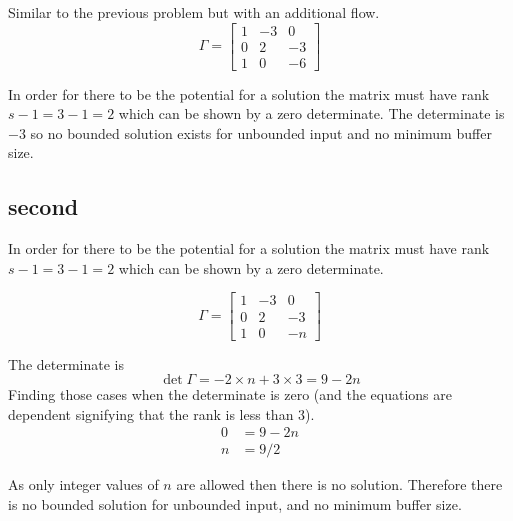 \documentclass{article}
\begin{document}
Similar to the previous problem but with an additional flow.
\begin{equation}
\Gamma =
\begin{bmatrix}
1 & -3 & 0 \\
0 & 2 & -3 \\
1 & 0 & -6
\end{bmatrix}
\end{equation}

In order for there to be the potential for a solution the
matrix must have rank $s - 1 = 3 - 1 = 2$ which can
be shown by a zero determinate. The determinate is $-3$
so no bounded solution exists for unbounded input and no minimum buffer size.



\subsection{second}



In order for there to be the potential for a solution the
matrix must have rank $s - 1 = 3 - 1 = 2$ which can
be shown by a zero determinate.

\begin{equation}
\Gamma =
\begin{bmatrix}
1 & -3 & 0 \\
0 & 2 & -3 \\
1 & 0 & -n
\end{bmatrix}
\end{equation}

The determinate is
\begin{equation}
\det{ \Gamma } = - 2 \times n + 3 \times 3 = 9 - 2 n
\end{equation}
Finding those cases when the determinate is zero (and the equations are dependent signifying that the rank is less than $3$).
\begin{align}
0 & = 9 - 2 n \\
n & = 9 / 2
\end{align}

As only integer values of $n$ are allowed then there is no solution. Therefore there is no bounded solution for unbounded input, and no minimum buffer size.
\end{document}

